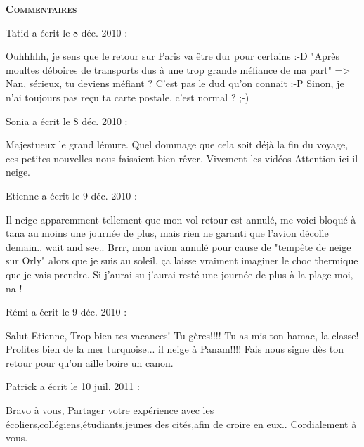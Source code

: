 \bigskip
\textbf{\textsc{Commentaires}}

\medskip
Tatid a écrit le 8 déc. 2010 :
\begin{displayquote}
Ouhhhhh, je sens que le retour sur Paris va être dur pour certains :-D
"Après moultes déboires de transports dus à une trop grande méfiance de ma part" => Nan, sérieux, tu deviens méfiant ? C'est pas le dud qu'on connait :-P
Sinon, je n'ai toujours pas reçu ta carte postale, c'est normal ? ;-)
\end{displayquote}

\medskip
Sonia a écrit le 8 déc. 2010 :
\begin{displayquote}
Majestueux le grand lémure.
Quel dommage que cela soit déjà la fin du voyage, ces petites nouvelles nous faisaient bien rêver.
Vivement les vidéos
Attention ici il neige.
\end{displayquote}

\medskip
Etienne a écrit le 9 déc. 2010 :
\begin{displayquote}
Il neige apparemment tellement que mon vol retour est annulé, me voici bloqué à tana au moins une journée de plus, mais rien ne garanti que l'avion décolle demain.. wait and see..
Brrr, mon avion annulé pour cause de "tempête de neige sur Orly" alors que je suis au soleil, ça laisse vraiment imaginer le choc thermique que je vais prendre. Si j'aurai su j'aurai resté une journée de plus à la plage moi, na !
\end{displayquote}

\medskip
Rémi a écrit le 9 déc. 2010 :
\begin{displayquote}
Salut Etienne,
Trop bien tes vacances!
Tu gères!!!! Tu as mis ton hamac, la classe!
Profites bien de la mer turquoise... il neige à Panam!!!!
Fais nous signe dès ton retour pour qu'on aille boire un canon.
\end{displayquote}

\medskip
Patrick a écrit le 10 juil. 2011 :
\begin{displayquote}
Bravo à vous,
Partager votre expérience avec les écoliers,collégiens,étudiants,jeunes des cités,afin de croire en eux..
Cordialement à vous.
\end{displayquote}

\vfill
